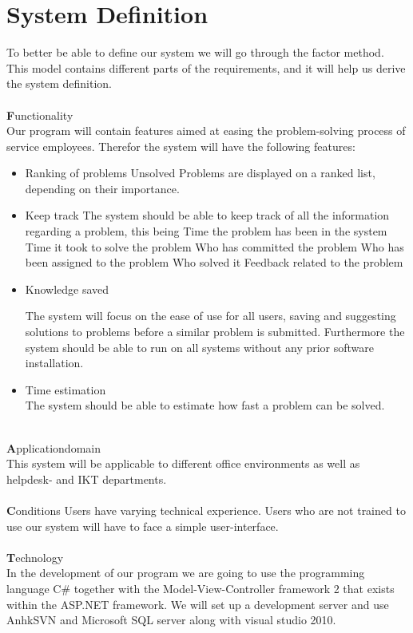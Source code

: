 \section{System Definition}
\label{sec:factor}
To better be able to define our system we will go through the factor method. This model contains different parts of the requirements, and it will help us derive the system definition.  \\
\ \\
{\Large \textbf{F}}unctionality \\
Our program will contain features aimed at easing the problem-solving process of service employees. Therefor the system will have the following features:
\begin{itemize}
\item Ranking of problems
Unsolved Problems are displayed on a ranked list, depending on their importance.
\item Keep track
The system should be able to keep track of all the information regarding a problem, this being
\subitem Time the problem has been in the system
\subsubitem Time it took to solve the problem
\subitem Who has committed the problem
\subitem Who has been assigned to the problem
\subsubitem Who solved it
\subitem Feedback related to the problem
\item Knowledge saved

The system will focus on the ease of use for all users, saving and suggesting solutions to problems before a similar problem is submitted. Furthermore the system should be able to run on all systems without any prior software installation.
\item Time estimation
\ \\
The system should be able to estimate how fast a problem can be solved.
\end{itemize}
\ \\
{\Large \textbf{A}}pplicationdomain \\
This system will be applicable to different office environments as well as helpdesk- and IKT departments.\\
\ \\
{\Large \textbf{C}}onditions Users have varying technical experience. Users who are not trained to use our system will have to face a simple user-interface.\\
\ \\
{\Large \textbf{T}}echnology \\
In the development of our program we are going to use the programming language C\# together with the Model-View-Controller framework 2 that exists within the ASP.NET framework. We will set up a development server and use AnhkSVN and Microsoft SQL server along with visual studio 2010.\\
